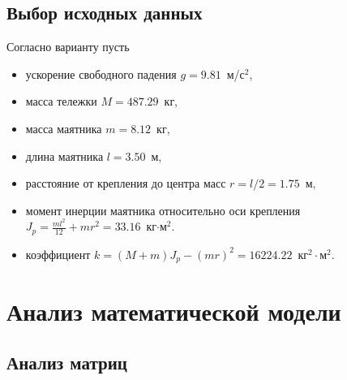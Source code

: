 \section{Выбор исходных данных}

Согласно варианту пусть
\begin{itemize}
    \item ускорение свободного падения $g=9.81$~м/с$^2$,
    \item масса тележки $M=487.29$~кг,
    \item масса маятника $m=8.12$~кг,
    \item длина маятника $l=3.50$~м,
    \item расстояние от крепления до центра масс $r=l/2=1.75$~м,
    \item момент инерции маятника относительно оси крепления $J_p=\frac{ml^2}{12}+mr^2=33.16$~кг$\cdot$м$^2$.
    \item коэффициент $k=(M+m)J_p-(mr)^2=16224.22$~кг$^2\cdot$м$^2$.
\end{itemize}

\chapter{Анализ математической модели}

\section{Анализ матриц}

